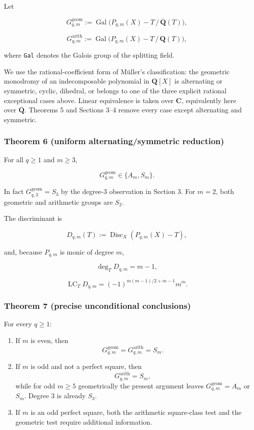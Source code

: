 Let

\[
 G^{\mathrm{geom}}_{q,m}
 :=\operatorname {Gal}
 \bigl(P_{q,m}(X)-T\,/\,\overline{\mathbf Q}(T)\bigr),
\]

\[
 G^{\mathrm{arith}}_{q,m}
 :=\operatorname {Gal}
 \bigl(P_{q,m}(X)-T\,/\,\mathbf Q(T)\bigr),
\]

where \texttt{Gal} denotes the Galois group of the splitting field.

We use the rational-coefficient form of Müller's classification: the
geometric monodromy of an indecomposable polynomial in \(\mathbf Q[X]\) is
alternating or symmetric, cyclic, dihedral, or belongs to one of the three
explicit rational exceptional cases above. Linear equivalence is taken over
\(\mathbf C\), equivalently here over \(\overline{\mathbf Q}\). Theorems 5
and Sections 3--4 remove every case except alternating and symmetric.

\subsubsection{Theorem 6 (uniform alternating/symmetric reduction)}

For all \(q\geq1\) and \(m\geq3\),

\[
 G^{\mathrm{geom}}_{q,m}\in\{A_m,S_m\}.
\]

In fact \(G^{\mathrm{geom}}_{q,3}=S_3\) by the degree-3 observation in
Section 3. For \(m=2\), both geometric and arithmetic groups are \(S_2\).

The discriminant is

\[
 D_{q,m}(T):=\operatorname {Disc}_X(P_{q,m}(X)-T),
\]

and, because \(P_{q,m}\) is monic of degree \(m\),

\[
 \deg_TD_{q,m}=m-1,
\]

\[
 \operatorname {LC}_T D_{q,m}
 =(-1)^{m(m-1)/2+m-1}m^m.
\]

\subsubsection{Theorem 7 (precise unconditional conclusions)}

For every \(q\geq1\):

\begin{enumerate}
\def\labelenumi{\arabic{enumi}.}
\tightlist
\item
  If \(m\) is even, then
  \[
  G^{\mathrm{geom}}_{q,m}
  =G^{\mathrm{arith}}_{q,m}=S_m.
  \]
\item
  If \(m\) is odd and not a perfect square, then
  \[
  G^{\mathrm{arith}}_{q,m}=S_m,
  \]
  while for odd \(m\ge5\) geometrically the present argument leaves
  \(G^{\mathrm{geom}}_{q,m}=A_m\) or \(S_m\). Degree \(3\) is already
  \(S_3\).
\item
  If \(m\) is an odd perfect square, both the arithmetic square-class test
  and the geometric test require additional information.
\end{enumerate}

